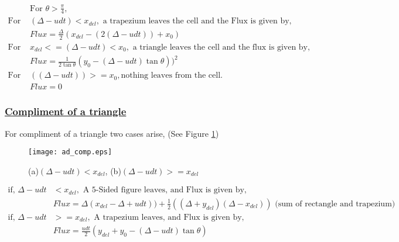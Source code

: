 \begin{equation*}
 \begin{align}
 &\text{For } \theta>\frac{\pi}{4}, \\
 \text{For } &(\Delta-udt)<x_{del},  \text{ a trapezium leaves the cell and the Flux is given by,} \\
&\boxed{ Flux = \frac{\Delta}{2}(x_{del} - (2(\Delta - udt)) + x_0) }\\
 \text{For }  &x_{del}<=(\Delta-udt)<x_0,  \text{ a triangle leaves the cell and the flux is given by,} \\
&\boxed{Flux =\frac{1}{2\tan\theta} (y_0 - (\Delta - udt)\tan\theta))^2} \\
\text{For } & ((\Delta-udt))>=x_0,  \text{nothing leaves from the cell.} \\
&\boxed{Flux =0}
\end{align}
\end{equation*}

\subsubsection{\underline{Compliment of a triangle}}
For compliment of a triangle two cases arise, (See Figure \ref{Fig:compliment_triangle})
\begin{figure}%
 \centering
 \texttt{[image: ad\_comp.eps]}
 \caption[Different cases for flux calculation for compliment of a triangle]{(a)$(\Delta-udt) < x_{del}$, (b)$(\Delta-udt) >= x_{del}$}
 \label{Fig:compliment_triangle}
\end{figure}
\begin{equation*}
\begin{aligned}
\text{if, } \Delta -udt &< x_{del}, \text{ A 5-Sided figure leaves,  and Flux is given by,} \\
&\boxed{Flux = \Delta(x_{del} - \Delta + udt)) + \frac{1}{2}((\Delta + y_{del})(\Delta - x_{del}))} \text{ (sum of rectangle and trapezium)} \\
\text{if, } \Delta -udt &>= x_{del},  \text{ A trapezium leaves, and Flux is given by,} \\
&\boxed{Flux =  \frac{udt}{2}( y_{del} + y_0 - (\Delta - udt)\tan\theta)}
\end{aligned}
\end{equation*}

